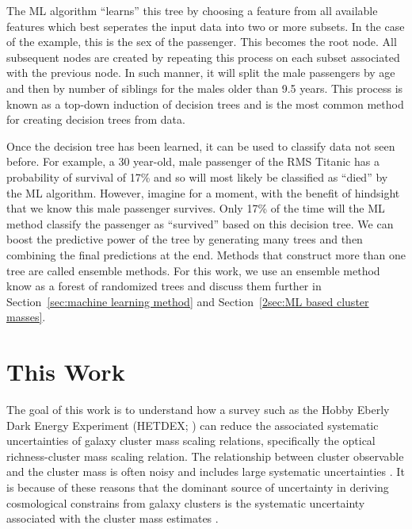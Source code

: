 The ML algorithm ``learns'' this tree by choosing a feature from all available features which best seperates the input data into two or more subsets. In the case of the example, this is the sex of the passenger. This becomes the root node. All subsequent nodes are created by repeating this process on each subset associated with the previous node. In such manner, it will split the male passengers by age and then by number of siblings for the males older than 9.5 years. This process is known as a top-down induction of decision trees and is the most common method for creating decision trees from data.

Once the decision tree has been learned, it can be used to classify data not seen before. For example, a 30 year-old, male passenger of the RMS Titanic has a probability of survival of 17\% and so will most likely be classified as ``died'' by the ML algorithm. However, imagine for a moment, with the benefit of hindsight that we know this male passenger survives. Only 17\% of the time will the ML method classify the passenger as ``survived'' based on this decision tree. We can boost the predictive power of the tree by generating many trees and then combining the final predictions at the end. Methods that construct more than one tree are called ensemble methods. For this work, we use an ensemble method know as a forest of randomized trees and discuss them further in Section~\ref{sec:machine learning method} and Section~\ref{2sec:ML based cluster masses}.

\section{This Work}
The goal of this work is to understand how a survey such as the Hobby Eberly Dark Energy Experiment (HETDEX; \citealt{Hill2008}) can reduce the associated systematic uncertainties of galaxy cluster mass scaling relations, specifically the optical richness-cluster mass scaling relation. The relationship between cluster observable and the cluster mass is often noisy and includes large systematic uncertainties . It is because of these reasons that the dominant source of uncertainty in deriving cosmological constrains from galaxy clusters is the systematic uncertainty associated with the cluster mass estimates .

